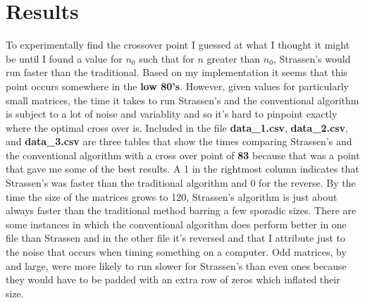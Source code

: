 \documentclass{article}
\begin{document}
	\section{Results}
	To experimentally find the crossover point I guessed at what I thought it might be until I found a value for $n_0$ such that for $n$ greater than $n_0$, Strassen's would run faster than the traditional.  Based on my implementation it seems that this point occurs somewhere in the \textbf{low 80's}.  However, given values for particularly small matrices, the time it takes to run Strassen's and the conventional algorithm is subject to a lot of noise and variablity and so it's hard to pinpoint exactly where the optimal cross over is.  Included in the file \textbf{data\_1.csv},  \textbf{data\_2.csv}, and \textbf{data\_3.csv} are three tables that show the times comparing Strassen's and the conventional algorithm with a cross over point of \textbf{83} because that was a point that gave me some of the best results.  A 1 in the rightmost column indicates that Strassen's was faster than the traditional algorithm and 0 for the reverse. By the time the size of the matrices grows to 120, Strassen's algorithm is just about always faster than the traditional method barring a few sporadic sizes.  There are some instances in which the conventional algorithm does perform better in one file than Strassen and in the other file it's reversed and that I attribute just to the noise that occurs when timing something on a computer.  Odd matrices, by and large, were more likely to run slower for Strassen's than even ones because they would have to be padded with an extra row of zeros which inflated their size.  \\
	
\end{document}
